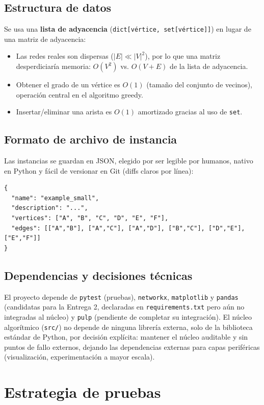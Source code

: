 \documentclass[11pt,a4paper]{article}
\begin{document}
\subsection{Estructura de datos}
Se usa una \textbf{lista de adyacencia} (\texttt{dict[vértice, set[vértice]]}) en lugar de
una matriz de adyacencia:
\begin{itemize}
	\item Las redes reales son dispersas ($|E| \ll |V|^2$), por lo que una matriz
	desperdiciaría memoria: $O(V^2)$ vs. $O(V+E)$ de la lista de adyacencia.
	\item Obtener el grado de un vértice es $O(1)$ (tamaño del conjunto de vecinos),
	operación central en el algoritmo greedy.
	\item Insertar/eliminar una arista es $O(1)$ amortizado gracias al uso de \texttt{set}.
\end{itemize}

\subsection{Formato de archivo de instancia}
Las instancias se guardan en JSON, elegido por ser legible por humanos, nativo en Python y
fácil de versionar en Git (diffs claros por línea):

\begin{lstlisting}
{
  "name": "example_small",
  "description": "...",
  "vertices": ["A", "B", "C", "D", "E", "F"],
  "edges": [["A","B"], ["A","C"], ["A","D"], ["B","C"], ["D","E"], ["E","F"]]
}
\end{lstlisting}

\subsection{Dependencias y decisiones técnicas}
El proyecto depende de \texttt{pytest} (pruebas), \texttt{networkx}, \texttt{matplotlib} y
\texttt{pandas} (candidatas para la Entrega 2, declaradas en \texttt{requirements.txt} pero
aún no integradas al núcleo) y \texttt{pulp} (pendiente de completar su integración). El
núcleo algorítmico (\texttt{src/}) no depende de ninguna librería externa, solo de la
biblioteca estándar de Python, por decisión explícita: mantener el núcleo auditable y sin
puntos de fallo externos, dejando las dependencias externas para capas periféricas
(visualización, experimentación a mayor escala).

\section{Estrategia de pruebas}
\label{sec:pruebas}
\end{document}
